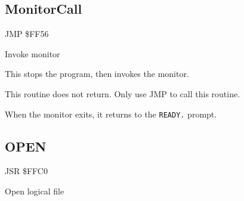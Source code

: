 
\newpage
\subsection{MonitorCall}
\label{KERNAL Jump Table!MonitorCall}
\begin{description}[leftmargin=2cm,style=nextline]
    \item [Address:] JMP \$FF56
    \item [Description:] Invoke monitor
    \item [Remarks:]
        This stops the program, then invokes the monitor.

        This routine does not return. Only use JMP to call this routine.

        When the monitor exits, it returns to the \texttt{READY.} prompt.
    \item [Example:]
\end{description}



\newpage
\subsection{OPEN}
\label{KERNAL Jump Table!OPEN}
\begin{description}[leftmargin=2cm,style=nextline]
    \item [Address:] JSR \$FFC0
    \item [Description:] Open logical file
    \item [Inputs:]
    \item [Outputs:]
    \item [Remarks:]
    \item [Example:]
\end{description}



\newpage
